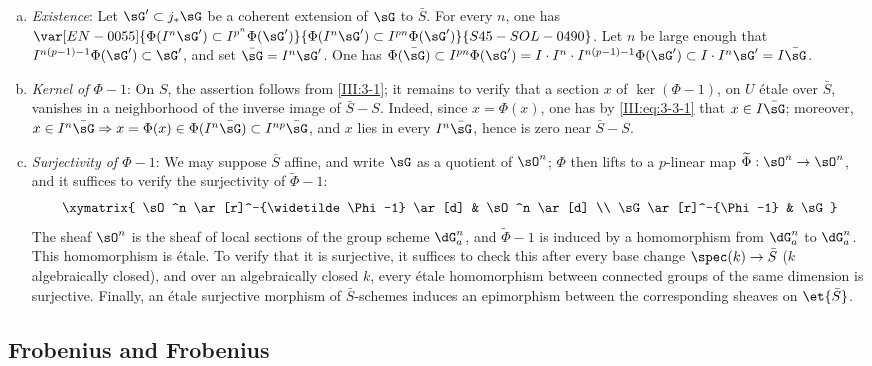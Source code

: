 \begin{enumerate}[a)]
  \item \emph{Existence}: Let $\sG'\subset j_*\sG$ be a coherent extension
    of $\sG$ to $\bar S$. For every $n$, one has
    $\var[EN-0055]{\Phi(I^n \sG')\subset I^{p^n}\Phi(\sG')}{\Phi(I^n \sG')\subset I^{p n}\Phi(\sG')}{S45-SOL-0490}$. Let $n$ be large enough that
    $I^{n(p-1)-1}\Phi(\sG')\subset \sG'$, and set $\bar\sG=I^n\sG'$.
    One has $\Phi(\bar\sG)\subset I^{p n}\Phi(\sG')
    =I\cdot I^n\cdot I^{n(p-1)-1}\Phi(\sG')\subset I\cdot I^n\sG'
    = I\bar\sG$.
  \item {}\emph{Kernel of $\Phi-1$}: On $S$, the assertion follows from
    \ref{III:3-1}; it remains to verify that a section $x$ of
    $\ker(\Phi-1)$, on $U$ étale over $\bar S$, vanishes in a neighborhood of
    the inverse image of $\bar S-S$. Indeed, since $x=\Phi(x)$, one
    has by \eqref{III:eq:3-3-1} that $x\in I\bar\sG$; moreover,
    $x\in I^n\bar\sG\Rightarrow x=\Phi(x)\in\Phi(I^n\bar\sG)\subset I^{n p}\bar\sG$, and $x$ lies in every $I^n\bar\sG$, hence is zero near $\bar S-S$.
  \item \emph{Surjectivity of $\Phi-1$}: We may suppose $\bar S$ affine, and
    write $\sG$ as a quotient of $\sO^n$; $\Phi$ then lifts to a $p$-linear
    map $\widetilde\Phi:\sO^n\to\sO^n$, and it suffices to verify the
    surjectivity of $\widetilde\Phi-1$:
    \[\xymatrix{
      \sO^n \ar[r]^-{\widetilde \Phi-1} \ar[d]
        & \sO^n \ar[d] \\
      \sG \ar[r]^-{\Phi-1}
        & \sG
    }\]
    The sheaf $\sO^n$ is the sheaf of local sections of the group scheme
    $\dG_a^n$, and $\widetilde\Phi-1$ is induced by a homomorphism from
    $\dG_a^n$ to $\dG_a^n$. This homomorphism is étale. To verify that it is
    surjective, it suffices to check this after every base change
    $\spec(k)\to\bar S$ ($k$ algebraically closed), and over an algebraically
    closed $k$, every étale homomorphism between connected groups of the same
    dimension is surjective. Finally, an étale surjective morphism of
    $\bar S$-schemes induces an epimorphism between the corresponding sheaves
    on $\et{\bar S}$.
\end{enumerate}






\subsection{Frobenius and Frobenius}\label{III:3-4}

